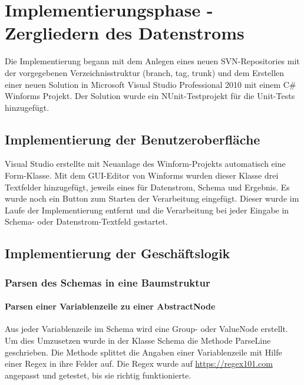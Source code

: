 \section{Implementierungsphase - Zergliedern des Datenstroms} 
\label{sec:ImplementierungsphaseDatenstromZergliedern}
Die Implementierung begann mit dem Anlegen eines neuen \ac{SVN}-Repositories mit der vorgegebenen Verzeichnisstruktur (branch, tag, trunk) und dem Erstellen einer neuen Solution in Microsoft Visual Studio Professional 2010 mit einem C\# Winforms Projekt. Der Solution wurde ein NUnit-Testprojekt für die Unit-Tests hinzugefügt.

\subsection{Implementierung der Benutzeroberfläche}
\label{sec:ImplementierungBenutzeroberflaeche}
Visual Studio erstellte mit Neuanlage des Winform-Projekts automatisch eine Form-Klasse. Mit dem GUI-Editor von Winforms wurden dieser Klasse drei Textfelder hinzugefügt, jeweils eines für Datenstrom, Schema und Ergebnis. Es wurde noch ein Button zum Starten der Verarbeitung eingefügt. Dieser wurde im Laufe der Implementierung  entfernt und die Verarbeitung bei jeder Eingabe in Schema- oder Datenstrom-Textfeld gestartet.

\subsection{Implementierung der Geschäftslogik}
\label{sec:ImplementierungGeschaeftslogik}
\subsubsection{Parsen des Schemas in eine Baumstruktur}
\label{sec:ParsenSchema}
\paragraph{Parsen einer Variablenzeile zu einer AbstractNode}

Aus jeder Variablenzeile im Schema wird eine Group- oder ValueNode erstellt. Um dies Umzusetzen wurde in der Klasse Schema die Methode ParseLine geschrieben. Die Methode splittet die Angaben einer Variablenzeile mit Hilfe einer \ac{Regex} in ihre Felder auf. Die \ac{Regex} wurde auf \href{https://regex101.com}{https://regex101.com} angepasst und getestet, bis sie richtig funktionierte.

